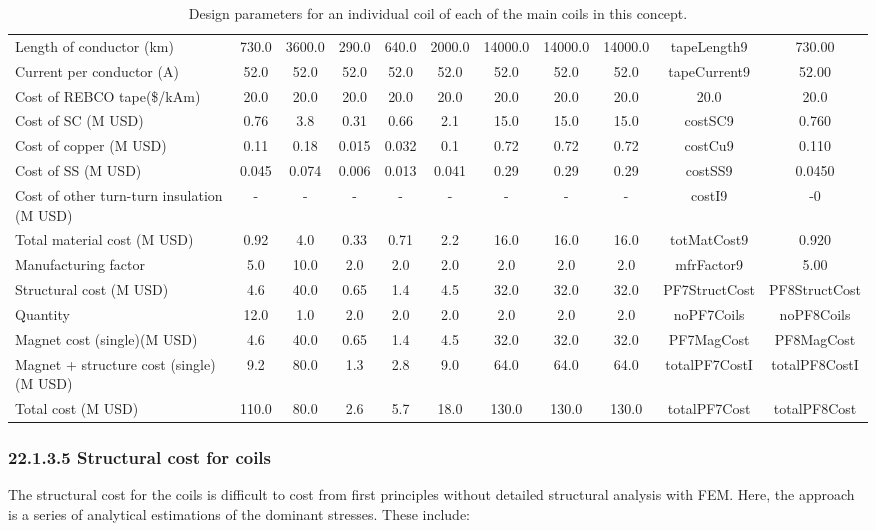 \begin{table}[h]
{\begin{tabular}{lcccccccccc}
Length of conductor (km) & 730.0 & 3600.0 & 290.0 & 640.0 & 2000.0 & 14000.0 & 14000.0 & 14000.0 & tapeLength9 & 730.00 \\
Current per conductor (A) & 52.0 & 52.0 & 52.0 & 52.0 & 52.0 & 52.0 & 52.0 & 52.0 & tapeCurrent9 & 52.00 \\
\hline
Cost of REBCO tape(\$/kAm) & 20.0 & 20.0 & 20.0 & 20.0 & 20.0 & 20.0 & 20.0 & 20.0 & 20.0 & 20.0 \\
Cost of SC (M USD) & 0.76 & 3.8 & 0.31 & 0.66 & 2.1 & 15.0 & 15.0 & 15.0 & costSC9 & 0.760 \\
Cost of copper (M USD) & 0.11 & 0.18 & 0.015 & 0.032 & 0.1 & 0.72 & 0.72 & 0.72 & costCu9 & 0.110 \\
Cost of SS (M USD) & 0.045 & 0.074 & 0.006 & 0.013 & 0.041 & 0.29 & 0.29 & 0.29 & costSS9 & 0.0450 \\
Cost of other turn-turn insulation (M USD) & - & - & - & - & - & - & - & - & costI9 & -0 \\
Total material cost (M USD) & 0.92 & 4.0 & 0.33 & 0.71 & 2.2 & 16.0 & 16.0 & 16.0 & totMatCost9 & 0.920 \\
Manufacturing factor & 5.0 & 10.0 & 2.0 & 2.0 & 2.0 & 2.0 & 2.0 & 2.0 & mfrFactor9 & 5.00 \\
Structural cost (M USD) & 4.6 & 40.0 & 0.65 & 1.4 & 4.5 & 32.0 & 32.0 & 32.0 & PF7StructCost & PF8StructCost \\
Quantity & 12.0 & 1.0 & 2.0 & 2.0 & 2.0 & 2.0 & 2.0 & 2.0 & noPF7Coils & noPF8Coils \\
Magnet cost (single)(M USD) & 4.6 & 40.0 & 0.65 & 1.4 & 4.5 & 32.0 & 32.0 & 32.0 & PF7MagCost & PF8MagCost \\
Magnet + structure cost (single) (M USD) & 9.2 & 80.0 & 1.3 & 2.8 & 9.0 & 64.0 & 64.0 & 64.0 & totalPF7CostI & totalPF8CostI \\
\hline
Total cost (M USD) & 110.0 & 80.0 & 2.6 & 5.7 & 18.0 & 130.0 & 130.0 & 130.0 & totalPF7Cost & totalPF8Cost \\
\hline
\end{tabular}}
\caption{Design parameters for an individual coil of each of the main coils in this concept.}
\label{your-table-label}
\end{table}


\subsubsection*{22.1.3.5 Structural cost for coils}

The structural cost for the coils is difficult to cost from first principles without detailed structural analysis with FEM. Here, the approach is a series of analytical estimations of the dominant stresses. These include:

